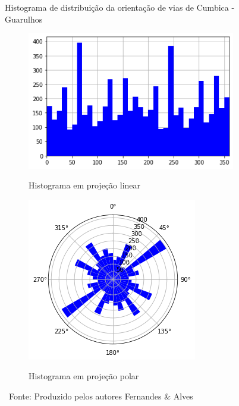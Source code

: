 \begin{figure}[htb]
    \centering
    \caption{Histograma de distribuição da orientação de vias de Cumbica - Guarulhos}
    \begin{subfigure}{.45\textwidth}
        \centering
        \caption{Histograma em projeção linear}
        \includegraphics[height=0.6\textwidth]{images/5_emp_bebidas/street_network_analysis/histogram_cumbica.png}
        \label{fig:Cumbica_bearing_example_histogram}
    \end{subfigure}
    \begin{subfigure}{.45\textwidth}
      \centering
      \caption{Histograma em projeção polar}
      \includegraphics[height=0.6\textwidth]{images/5_emp_bebidas/street_network_analysis/polar_plot_cumbica.png}
      \label{fig:Cumbica_bearing_example_polarplot}
    \end{subfigure}
    \caption*{\ Fonte: Produzido pelos autores Fernandes \& Alves}
\end{figure}

